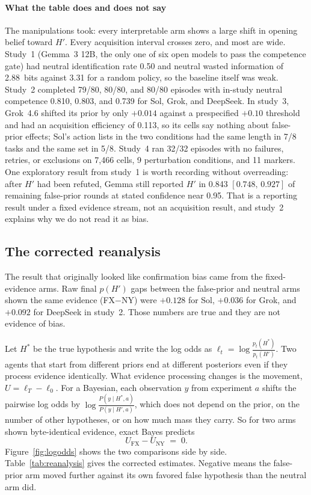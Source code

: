 \documentclass[10pt,letterpaper,twocolumn]{article}
\begin{document}
\paragraph{What the table does and does not say}
The manipulations took: every interpretable arm shows a large shift in opening belief toward $H'$. Every acquisition interval crosses zero, and most are wide. Study~1 (Gemma~3 12B, the only one of six open models to pass the competence gate) had neutral identification rate 0.50 and neutral wasted information of 2.88~bits against 3.31 for a random policy, so the baseline itself was weak. Study~2 completed 79/80, 80/80, and 80/80 episodes with in-study neutral competence 0.810, 0.803, and 0.739 for Sol, Grok, and DeepSeek. In study~3, Grok~4.6 shifted its prior by only $+0.014$ against a prespecified $+0.10$ threshold and had an acquisition efficiency of 0.113, so its cells say nothing about false-prior effects; Sol's action lists in the two conditions had the same length in 7/8 tasks and the same set in 5/8. Study~4 ran 32/32 episodes with no failures, retries, or exclusions on 7,466 cells, 9 perturbation conditions, and 11 markers. One exploratory result from study~1 is worth recording without overreading: after $H'$ had been refuted, Gemma still reported $H'$ in 0.843 $[0.748,\,0.927]$ of remaining false-prior rounds at stated confidence near 0.95. That is a reporting result under a fixed evidence stream, not an acquisition result, and study~2 explains why we do not read it as bias.

\subsection{The corrected reanalysis}
\label{sec:reanalysis}

The result that originally looked like confirmation bias came from the fixed-evidence arms. Raw final $p(H')$ gaps between the false-prior and neutral arms shown the same evidence (FX$-$NY) were $+0.128$ for Sol, $+0.036$ for Grok, and $+0.092$ for DeepSeek in study~2. Those numbers are true and they are not evidence of bias.

Let $H^*$ be the true hypothesis and write the log odds as $\ell_t = \log \frac{p_t(H^*)}{p_t(H')}$. Two agents that start from different priors end at different posteriors even if they process evidence identically. What evidence processing changes is the movement, $U = \ell_T - \ell_0$. For a Bayesian, each observation $y$ from experiment $a$ shifts the pairwise log odds by $\log \frac{P(y\mid H^*,a)}{P(y\mid H',a)}$, which does not depend on the prior, on the number of other hypotheses, or on how much mass they carry. So for two arms shown byte-identical evidence, exact Bayes predicts
\begin{equation}
U_{\mathrm{FX}} - U_{\mathrm{NY}} \;=\; 0 .
\label{eq:U}
\end{equation}
Figure~\ref{fig:logodds} shows the two comparisons side by side. Table~\ref{tab:reanalysis} gives the corrected estimates. Negative means the false-prior arm moved further against its own favored false hypothesis than the neutral arm did.
\end{document}
